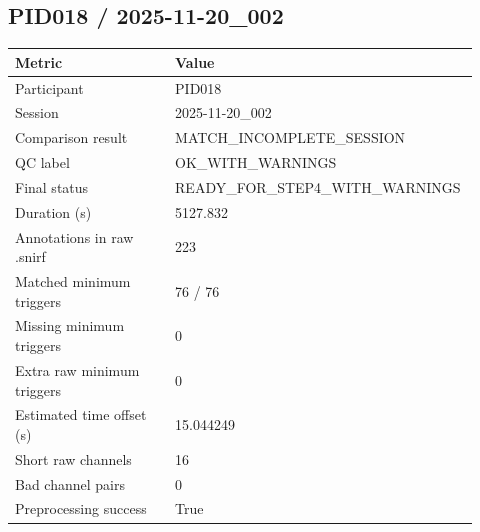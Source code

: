 \subsection*{PID018 / 2025-11-20\_002}
\begin{tabular}{p{0.34\linewidth}p{0.58\linewidth}}
\toprule
Metric & Value\\
\midrule
Participant & PID018\\
Session & 2025-11-20\_002\\
Comparison result & MATCH\_INCOMPLETE\_SESSION\\
QC label & OK\_WITH\_WARNINGS\\
Final status & READY\_FOR\_STEP4\_WITH\_WARNINGS\\
Duration (s) & 5127.832\\
Annotations in raw .snirf & 223\\
Matched minimum triggers & 76 / 76\\
Missing minimum triggers & 0\\
Extra raw minimum triggers & 0\\
Estimated time offset (s) & 15.044249\\
Short raw channels & 16\\
Bad channel pairs & 0\\
Preprocessing success & True\\
\bottomrule
\end{tabular}
